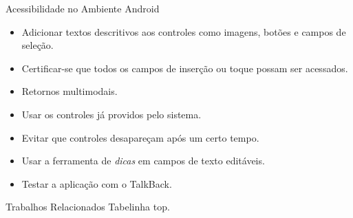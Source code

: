 \begin{frame}[allowframebreaks]{Acessibilidade no Ambiente Android}
	\begin{itemize}
		\setlength{\itemsep}{0.5em}
		\item<1-> Adicionar textos descritivos aos controles como imagens, botões e campos de seleção.
		\item<1-> Certificar-se que todos os campos de inserção ou toque possam ser acessados.
		\item<1-> Retornos multimodais.
		\item<1-> Usar os controles já providos pelo sistema.
		\item<1-> Evitar que controles desapareçam após um certo tempo.
		\item<1-> Usar a ferramenta de \emph{dicas} em campos de texto editáveis.
		\item<1-> Testar a aplicação com o TalkBack.
	\end{itemize}
\end{frame}

\begin{frame}[allowframebreaks]{Trabalhos Relacionados}
	Tabelinha top.
\end{frame}